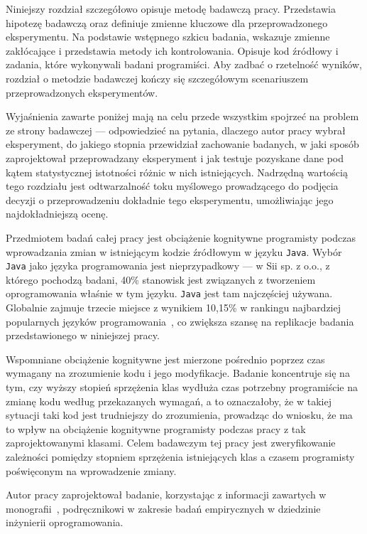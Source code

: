 Niniejszy rozdział szczegółowo opisuje metodę badawczą pracy.
Przedstawia hipotezę badawczą oraz definiuje zmienne kluczowe dla przeprowadzonego eksperymentu.
Na podstawie wstępnego szkicu badania, wskazuje zmienne zakłócające i przedstawia metody ich kontrolowania.
Opisuje kod źródłowy i zadania, które wykonywali badani programiści.
Aby zadbać o rzetelność wyników, rozdział o metodzie badawczej kończy się szczegółowym scenariuszem przeprowadzonych
eksperymentów.

Wyjaśnienia zawarte poniżej mają na celu przede wszystkim spojrzeć na problem ze strony badawczej --- odpowiedzieć
na pytania, dlaczego autor pracy wybrał eksperyment, do jakiego stopnia przewidział zachowanie badanych, w
jaki sposób zaprojektował przeprowadzany eksperyment i jak testuje pozyskane dane pod kątem statystycznej istotności
różnic w nich istniejących.
Nadrzędną wartością tego rozdziału jest odtwarzalność toku myślowego prowadzącego do podjęcia decyzji o
przeprowadzeniu dokładnie tego eksperymentu, umożliwiając jego najdokładniejszą ocenę.

Przedmiotem badań całej pracy jest obciążenie kognitywne programisty podczas wprowadzania zmian w
istniejącym kodzie źródłowym w języku \texttt{Java}.
Wybór \texttt{Java}
jako języka programowania jest nieprzypadkowy --- w Sii sp. z o.o., z którego pochodzą badani, 40\%
stanowisk jest związanych z tworzeniem oprogramowania właśnie w tym języku.
\texttt{Java} jest tam najczęściej używana.
Globalnie zajmuje trzecie miejsce z wynikiem 10,15\% w rankingu najbardziej popularnych języków
programowania~\cite{TiobeIndex2024}, co zwiększa szansę na replikacje badania przedstawionego w niniejszej pracy.

Wspomniane obciążenie kognitywne jest mierzone pośrednio poprzez czas wymagany na zrozumienie kodu i jego modyfikacje.
Badanie koncentruje się na tym, czy wyższy stopień sprzężenia klas wydłuża czas potrzebny programiście na zmianę
kodu według przekazanych wymagań, a to oznaczałoby, że w takiej sytuacji taki kod jest trudniejszy do zrozumienia,
prowadząc do wniosku, że ma to wpływ na obciążenie kognitywne programisty podczas pracy z tak zaprojektowanymi klasami.
Celem badawczym tej pracy jest zweryfikowanie zależności pomiędzy stopniem sprzężenia istniejących klas
a czasem programisty poświęconym na wprowadzenie zmiany.

Autor pracy zaprojektował badanie, korzystając z informacji zawartych w monografii~\cite{wohlin2012experimentation},
podręcznikowi w zakresie badań empirycznych w dziedzinie inżynierii oprogramowania.
